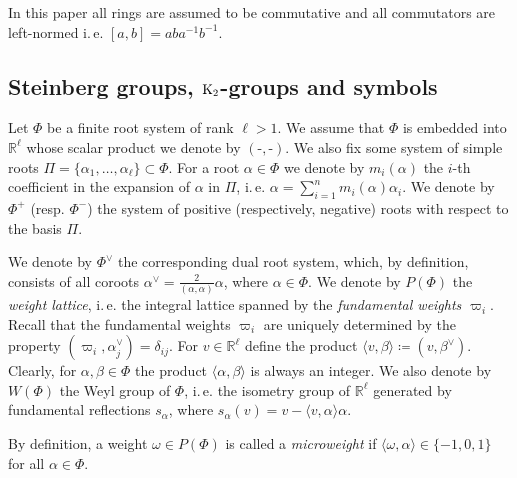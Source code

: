 In this paper all rings are assumed to be commutative and all commutators are left-normed i.\,e. $[a, b] = a b a^{-1} b^{-1}$.

\subsection{Steinberg groups, $\operatorname{K}_2$-groups and symbols}\label{subsec:steinberg-preliminaries}
Let $\Phi$ be a finite root system of rank $\ell > 1$.
We assume that $\Phi$ is embedded into $\mathbb{R}^\ell$ whose scalar product we denote by $(\text{-}, \text{-})$.
We also fix some system of simple roots $\Pi = \{\alpha_1, \ldots, \alpha_\ell\} \subset \Phi$.
For a root $\alpha\in\Phi$ we denote by $m_i(\alpha)$ the $i$-th coefficient in the expansion of $\alpha$ in $\Pi$,
i.\,e. $\alpha = \sum_{i=1}^n m_i(\alpha) \alpha_i$.
We denote by $\Phi^+$ (resp. $\Phi^-$) the system of positive (respectively, negative) roots with respect to the basis $\Pi$.

We denote by $\Phi^\vee$ the corresponding dual root system, which, by definition, consists of all coroots $\alpha^\vee = \frac{2}{(\alpha, \alpha)} \alpha$, where $\alpha \in \Phi$.
We denote by $P(\Phi)$ the \textit{weight lattice}, i.\,e. the integral lattice spanned by the \emph{fundamental weights $\varpi_i$}.
Recall that the fundamental weights $\varpi_i$ are uniquely determined by the property $(\varpi_i, \alpha_j^\vee) = \delta_{ij}$.
For $v \in \mathbb{R}^\ell$ define the product $\langle v, \beta \rangle \coloneqq (v, \beta^\vee).$
Clearly, for $\alpha,\beta \in \Phi$ the product $\langle \alpha, \beta\rangle$ is always an integer.
We also denote by $W(\Phi)$ the Weyl group of $\Phi$, i.\,e. the isometry group of $\mathbb{R}^\ell$ generated by fundamental reflections $s_\alpha$,
where $s_\alpha(v) = v - \langle v, \alpha\rangle \alpha$.

By definition, a weight $\omega \in P(\Phi)$ is called a \textit{microweight} if $\langle \omega, \alpha \rangle \in \{ -1, 0, 1 \}$ for all $\alpha \in \Phi$.

